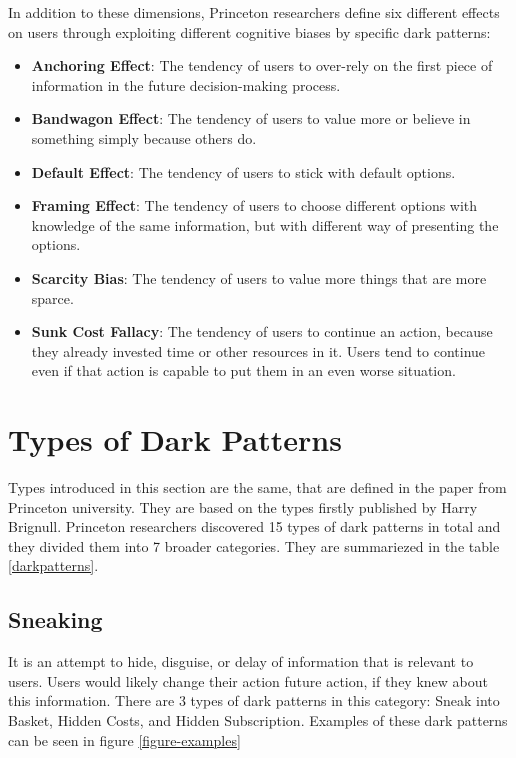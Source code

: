 In addition to these dimensions, Princeton researchers define six different effects on users through exploiting different cognitive biases by specific dark patterns:

\begin{itemize}
    \item \textbf{Anchoring Effect}: The tendency of users to over-rely on the first piece of information in the future decision-making process.
    \item \textbf{Bandwagon Effect}: The tendency of users to value more or believe in something simply because others do.
    \item \textbf{Default Effect}: The tendency of users to stick with default options.
    \item \textbf{Framing Effect}: The tendency of users to choose different options with knowledge of the same information, but with different way of presenting the options.
    \item \textbf{Scarcity Bias}: The tendency of users to value more things that are more sparce.
    \item \textbf{Sunk Cost Fallacy}: The tendency of users to continue an action, because they already invested time or other resources in it. Users tend to continue even if that action is capable to put them in an even worse situation.
\end{itemize}

\section{Types of Dark Patterns}
Types introduced in this section are the same, that are defined in the paper from Princeton university\cite{dark-patterns-at-scale}. They are based on the types firstly published by Harry Brignull\cite{dark-patterns-brignull}.
Princeton researchers discovered 15 types of dark patterns in total and they divided them into 7 broader categories. They are summariezed in the table \ref{darkpatterns}.
    \subsection*{Sneaking}
    It is an attempt to hide, disguise, or delay of information that is relevant to users. Users would likely change their action future action, if they knew about this information. There are 3 types of dark patterns in this category: Sneak into Basket, Hidden Costs, and Hidden Subscription. Examples of these dark patterns can be seen in figure \ref{figure-examples}
    \blind[1]
